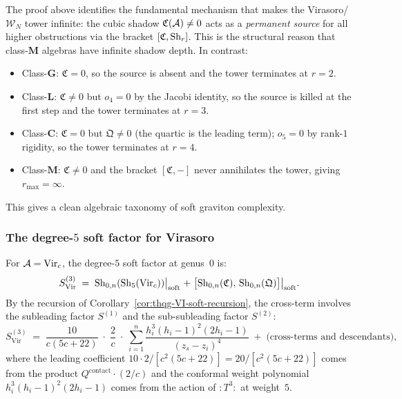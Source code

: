 \begin{remark}
\label{rem:thqg-VI-cubic-source}
The proof above identifies the fundamental mechanism that makes
the Virasoro/\hskip0pt$\mathcal{W}_N$ tower infinite: the
cubic shadow $\mathfrak{C}(\mathcal{A}) \neq 0$ acts as a
\emph{permanent source} for all higher obstructions via the
bracket $[\mathfrak{C}, \operatorname{Sh}_r]$. This is the structural
reason that class-$\mathbf{M}$ algebras have infinite shadow
depth. In contrast:
\begin{itemize}
\item Class-$\mathbf{G}$: $\mathfrak{C} = 0$, so
 the source is absent and the tower terminates at $r = 2$.
\item Class-$\mathbf{L}$: $\mathfrak{C} \neq 0$ but
 $o_4 = 0$ by the Jacobi identity, so the source is
 killed at the first step and the tower terminates at $r = 3$.
\item Class-$\mathbf{C}$: $\mathfrak{C} = 0$ but
 $\mathfrak{Q} \neq 0$ (the quartic is the leading term);
 $o_5 = 0$ by rank-$1$ rigidity, so the tower terminates at
 $r = 4$.
\item Class-$\mathbf{M}$: $\mathfrak{C} \neq 0$ and the
 bracket $[\mathfrak{C}, -]$ never annihilates the tower,
 giving $r_{\max} = \infty$.
\end{itemize}
This gives a clean algebraic taxonomy of soft graviton complexity.
\end{remark}

\subsubsection{The degree-$5$ soft factor for Virasoro}

\begin{computation}
\label{comp:thqg-VI-virasoro-quintic-soft}
For $\mathcal{A} = \mathrm{Vir}_c$, the degree-$5$ soft factor at genus~$0$
is:
\begin{equation}\label{eq:thqg-VI-virasoro-quintic-soft}
S^{(3)}_{\mathrm{Vir}}
\;=\;
\operatorname{Sh}_{0,n}(\operatorname{Sh}_5(\mathrm{Vir}_c))\bigl|_{\text{soft}}
\;+\;
\bigl[\operatorname{Sh}_{0,n}(\mathfrak{C}),\,
\operatorname{Sh}_{0,n}(\mathfrak{Q})\bigr]\bigl|_{\text{soft}}.
\end{equation}
By the recursion of Corollary~\ref{cor:thqg-VI-soft-recursion}, the
cross-term involves the subleading factor $S^{(1)}$ and the
sub-subleading factor $S^{(2)}$:
\begin{equation}\label{eq:thqg-VI-virasoro-s3-explicit}
S^{(3)}_{\mathrm{Vir}}
\;=\;
\frac{10}{c(5c+22)}\;\cdot\;
\frac{2}{c}\;\cdot\;
\sum_{i=1}^{n}
\frac{h_i^3(h_i-1)^2(2h_i - 1)}{(z_s - z_i)^4}
\;+\; \text{(cross-terms and descendants)},
\end{equation}
where the leading coefficient $10\cdot 2/[c^2(5c+22)]
= 20/[c^2(5c+22)]$ comes from the product
$Q^{\mathrm{contact}} \cdot (2/c)$ and the conformal weight
polynomial $h_i^3(h_i-1)^2(2h_i-1)$ comes from the action
of $:T^3:$ at weight~$5$.
\end{computation}

